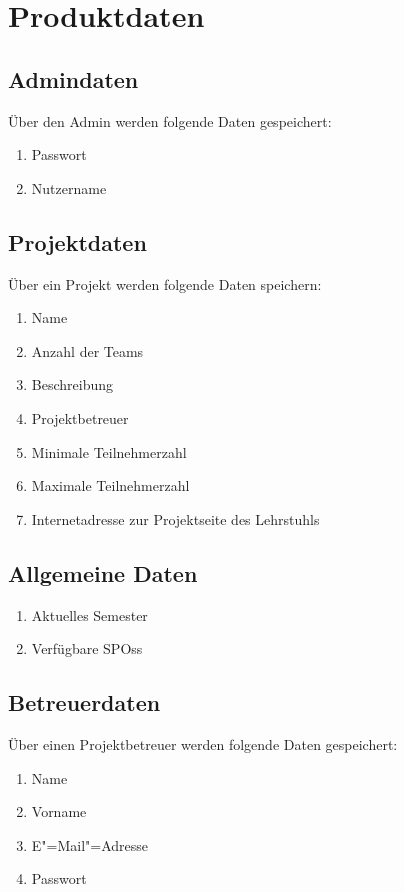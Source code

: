 \documentclass[parskip=full]{scrartcl}
\newcommand{\swtLabel}[1]{\textbf{/#1\arabic*0/}}
\begin{document}
\section{Produktdaten}

\subsection{\gls{Admin}daten}
Über den \gls{Admin} werden folgende Daten gespeichert:
\begin{enumerate}[label=\swtLabel{D}] 
	\item Passwort
	\item Nutzername
\end{enumerate}

\subsection{\gls{Projekt}daten}
Über ein \gls{Projekt} werden folgende Daten speichern:
\begin{enumerate}[label=\swtLabel{D},resume] 
  \item Name \label{DProjektAnfang}
  \item Anzahl der \glspl{Team}
  \item Beschreibung
  \item \gls{Projektbetreuer}
  \item Minimale Teilnehmerzahl
  \item Maximale Teilnehmerzahl
  \item Internetadresse zur \gls{Projekt}seite des Lehrstuhls \label{DProjektEnde}
\end{enumerate}
 
\subsection{Allgemeine Daten}
\begin{enumerate}[label=\swtLabel{D},resume]
  \item Aktuelles Semester
  \item Verfügbare \glspl{SPO}s
\end{enumerate}

\subsection{Betreuerdaten}
Über einen \gls{Projektbetreuer} werden folgende Daten gespeichert:
\begin{enumerate}[label=\swtLabel{D}, resume] 
	\item Name \label{DbetAnfang}
	\item Vorname
	\item E"=Mail"=Adresse
	\item Passwort \label{DbetEnde}
\end{enumerate}
\end{document}
